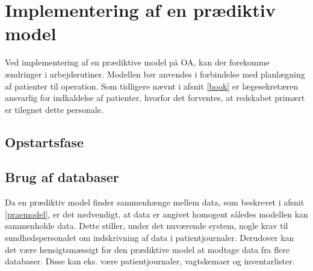 \section{Implementering af en prædiktiv model}
Ved implementering af en prædiktive model på OA, kan der forekomme ændringer i arbejdsrutiner. Modellen bør anvendes i forbindelse med planlægning af patienter til operation. Som tidligere nævnt i afsnit \ref{book} er lægesekretæren ansvarlig for indkaldelse af patienter, hvorfor det forventes, at redskabet primært er tilegnet dette personale.


\subsection{Opstartsfase}


\subsection{Brug af databaser}
Da en prædiktiv model finder sammenhænge mellem data, som beskrevet i afsnit \ref{praemodel}, er det nødvendigt, at data er angivet homogent således modellen kan sammenholde data\cite{Kuhn2013}. 
Dette stiller, under det nuværende system, nogle krav til sundhedspersonalet om indskrivning af data i patientjournaler. Derudover kan det være hensigtsmæssigt for den prædiktive model at modtage data fra flere databaser. Disse kan eks. være patientjournaler, vagtskemaer og inventarlister.



